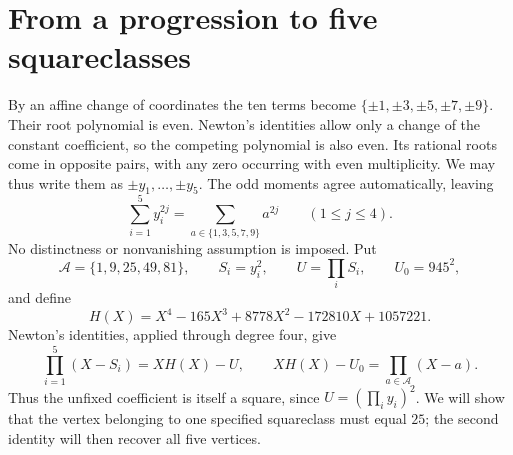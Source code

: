 \section{From a progression to five squareclasses}\label{sec:vertices}

By an affine change of coordinates the ten terms become \(\{\pm1,\pm3,\pm5,\pm7,\pm9\}\). Their root polynomial is even. Newton’s identities allow only a change of the constant coefficient, so the competing polynomial is also even. Its rational roots come in opposite pairs, with any zero occurring with even multiplicity. We may thus write them as \(\pm y_1,\ldots,\pm y_5\). The odd moments agree automatically, leaving
\begin{equation}\label{eq:four-even-moments}
 \sum_{i=1}^{5}y_i^{2j}=\sum_{a\in\{1,3,5,7,9\}}a^{2j}
 \qquad(1\leq j\leq4).
\end{equation}
No distinctness or nonvanishing assumption is imposed. Put
\[
 \mathcal A=\{1,9,25,49,81\},\qquad S_i=y_i^2,\qquad
 U=\prod_i S_i,\qquad U_0=945^2,
\]
and define
\begin{equation}\label{eq:H-polynomial}
 H(X)=X^4-165X^3+8778X^2-172810X+1057221.
\end{equation}
Newton's identities, applied through degree four, give
\begin{equation}\label{eq:split-quintic}
 \prod_{i=1}^{5}(X-S_i)=XH(X)-U,\qquad
 XH(X)-U_0=\prod_{a\in\mathcal A}(X-a).
\end{equation}
Thus the unfixed coefficient is itself a square, since
$U=(\prod_i y_i)^2$. We will show that the vertex belonging to one
specified squareclass must equal $25$; the second identity will then
recover all five vertices.

